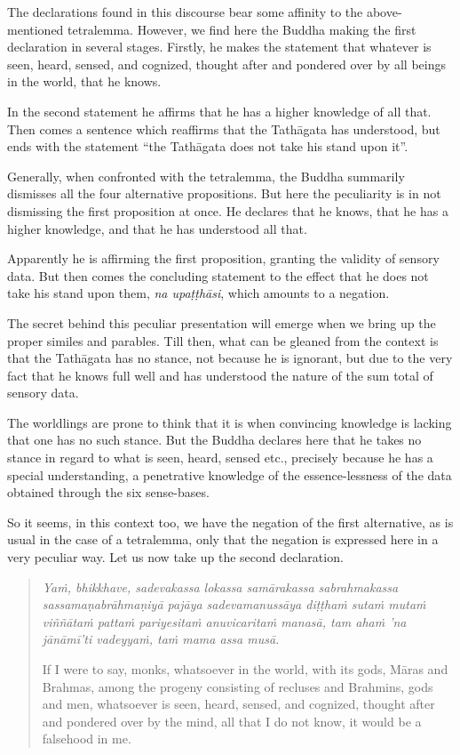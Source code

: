 The declarations found in this discourse bear some affinity to the above-mentioned tetralemma. However, we find here the Buddha making the first declaration in several stages. Firstly, he makes the statement that whatever is seen, heard, sensed, and cognized, thought after and pondered over by all beings in the world, that he knows.

In the second statement he affirms that he has a higher knowledge of all that. Then comes a sentence which reaffirms that the Tathāgata has understood, but ends with the statement ``the Tathāgata does not take his stand upon it''.

Generally, when confronted with the tetralemma, the Buddha summarily dismisses all the four alternative propositions. But here the peculiarity is in not dismissing the first proposition at once. He declares that he knows, that he has a higher knowledge, and that he has understood all that.

Apparently he is affirming the first proposition, granting the validity of sensory data. But then comes the concluding statement to the effect that he does not take his stand upon them, \emph{na upaṭṭhāsi}, which amounts to a negation.

The secret behind this peculiar presentation will emerge when we bring up the proper similes and parables. Till then, what can be gleaned from the context is that the Tathāgata has no stance, not because he is ignorant, but due to the very fact that he knows full well and has understood the nature of the sum total of sensory data.

The worldlings are prone to think that it is when convincing knowledge is lacking that one has no such stance. But the Buddha declares here that he takes no stance in regard to what is seen, heard, sensed etc., precisely because he has a special understanding, a penetrative knowledge of the essence-lessness of the data obtained through the six sense-bases.

So it seems, in this context too, we have the negation of the first alternative, as is usual in the case of a tetralemma, only that the negation is expressed here in a very peculiar way. Let us now take up the second declaration.

\begin{quote}
\emph{Yaṁ, bhikkhave, sadevakassa lokassa samārakassa sabrahmakassa sassamaṇabrāhmaṇiyā pajāya sadevamanussāya diṭṭhaṁ sutaṁ mutaṁ viññātaṁ pattaṁ pariyesitaṁ anuvicaritaṁ manasā, tam ahaṁ 'na jānāmī'ti vadeyyaṁ, taṁ mama assa musā.}

If I were to say, monks, whatsoever in the world, with its gods, Māras and Brahmas, among the progeny consisting of recluses and Brahmins, gods and men, whatsoever is seen, heard, sensed, and cognized, thought after and pondered over by the mind, all that I do not know, it would be a falsehood in me.
\end{quote}

